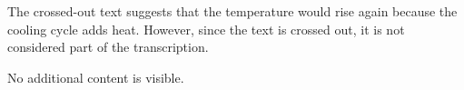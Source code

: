 The crossed-out text suggests that the temperature would rise again because the cooling cycle adds heat. However, since the text is crossed out, it is not considered part of the transcription.  

No additional content is visible.